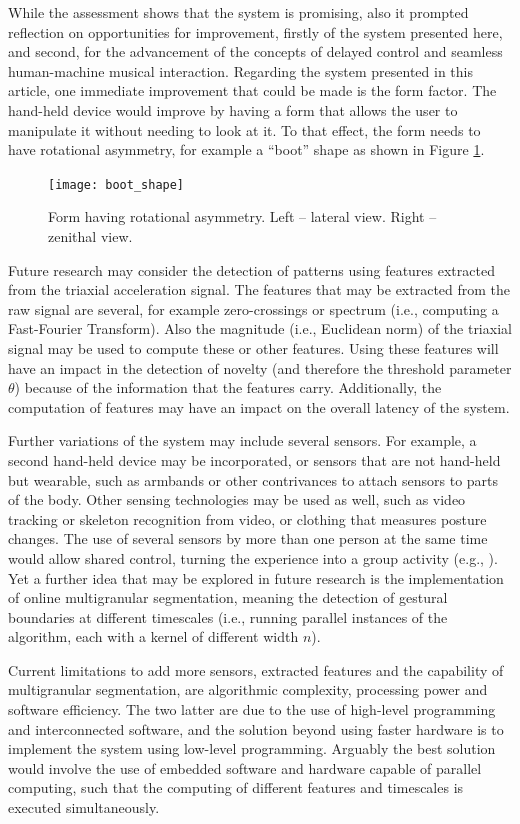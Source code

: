 \documentclass{nime-alternate_MANUSCRIPT} %
\begin{document}
While the assessment shows that the system is promising, also it prompted reflection on opportunities for improvement, firstly of the system presented here, and second, for the advancement of the concepts of delayed control and seamless human-machine musical interaction. Regarding the system presented in this article, one immediate improvement that could be made is the form factor. The hand-held device would improve by having a form that allows the user to manipulate it without needing to look at it. To that effect, the form needs to have rotational asymmetry, for example a ``boot'' shape as shown in Figure \ref{fig_8}.
	
\begin{figure}[t!]
	\centering
		\texttt{[image: boot\_shape]}
	\caption{Form having rotational asymmetry. Left -- lateral view. Right -- zenithal view.}
	\label{fig_8}
\end{figure}	 

Future research may consider the detection of patterns using features extracted from the triaxial acceleration signal. The features that may be extracted from the raw signal are several, for example zero-crossings or spectrum (i.e., computing a Fast-Fourier Transform). Also the magnitude (i.e., Euclidean norm) of the triaxial signal may be used to compute these or other features. Using these features will have an impact in the detection of novelty (and therefore the threshold parameter $\theta $) because of the information that the features carry. Additionally, the computation of features may have an impact on the overall latency of the system. 

Further variations of the system may include several sensors. For example, a second hand-held device may be incorporated, or sensors that are not hand-held but wearable, such as armbands or other contrivances to attach sensors to parts of the body. Other sensing technologies may be used as well, such as video tracking or skeleton recognition from video, or clothing that measures posture changes. The use of several sensors by more than one person at the same time would allow shared control, turning the experience into a group activity (e.g., \cite{Staudt_etal_2022, Tahiroglu_etal_2013}). Yet a further idea that may be explored in future research is the implementation of online multigranular segmentation, meaning the detection of gestural boundaries at different timescales (i.e., running parallel instances of the algorithm, each with a kernel of different width $n$). 

Current limitations to add more sensors, extracted features and the capability of multigranular segmentation, are algorithmic complexity, processing power and software efficiency. The two latter are due to the use of high-level programming and interconnected software, and the solution beyond using faster hardware is to implement the system using low-level programming. Arguably the best solution would involve the use of embedded software and hardware capable of parallel computing, such that the computing of different features and timescales is executed simultaneously. 
\end{document}

